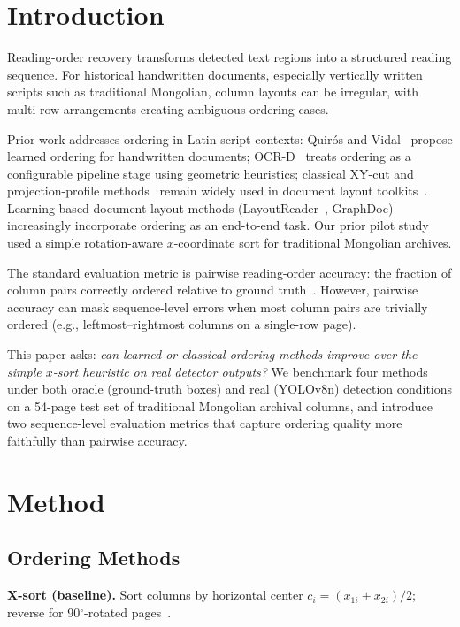 \documentclass[5p,times,twocolumn]{elsarticle}
\begin{document}
\section{Introduction}
Reading-order recovery transforms detected text regions into a structured reading sequence. For historical handwritten documents, especially vertically written scripts such as traditional Mongolian, column layouts can be irregular, with multi-row arrangements creating ambiguous ordering cases.

Prior work addresses ordering in Latin-script contexts: Quir\'os and Vidal~\cite{quiros2022reading} propose learned ordering for handwritten documents; OCR-D~\cite{neudecker2019ocrd} treats ordering as a configurable pipeline stage using geometric heuristics; classical XY-cut and projection-profile methods~\cite{ha1995recursive,liu2022layoutreader} remain widely used in document layout toolkits~\cite{shen2021layoutparser}. Learning-based document layout methods (LayoutReader~\cite{liu2022layoutreader}, GraphDoc) increasingly incorporate ordering as an end-to-end task. Our prior pilot study~\cite{liang2025pilot} used a simple rotation-aware $x$-coordinate sort for traditional Mongolian archives.

The standard evaluation metric is pairwise reading-order accuracy: the fraction of column pairs correctly ordered relative to ground truth~\cite{quiros2022reading}. However, pairwise accuracy can mask sequence-level errors when most column pairs are trivially ordered (e.g., leftmost--rightmost columns on a single-row page).

This paper asks: \textit{can learned or classical ordering methods improve over the simple $x$-sort heuristic on real detector outputs?} We benchmark four methods under both oracle (ground-truth boxes) and real (YOLOv8n) detection conditions on a 54-page test set of traditional Mongolian archival columns, and introduce two sequence-level evaluation metrics that capture ordering quality more faithfully than pairwise accuracy.

\section{Method}

\subsection{Ordering Methods}
\textbf{X-sort (baseline).} Sort columns by horizontal center $c_i = (x_{1i}+x_{2i})/2$; reverse for 90$^\circ$-rotated pages~\cite{liang2025pilot}.
\end{document}

